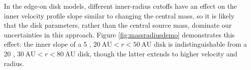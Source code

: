 \documentclass[twocolumn]{aastex61}
\newcommand{\sourcei}{SrcI\xspace}
\begin{document}




In the edge-on disk models, different inner-radius cutoffs have an effect on
the inner velocity profile slope similar to changing the central mass, so it is
likely that the disk parameters, rather than the central source mass, dominate
our uncertainties in this approach.  
Figure \ref{fig:massradiusdemo} demonstrates this effect: the inner slope of
a 5 \msun, $20~\mathrm{AU} < r < 50~\mathrm{AU}$ disk is indistinguishable
from a 20 \msun , $30~\mathrm{AU} < r < 80~\mathrm{AU}$ disk, though the latter
extends to higher velocity and radius.

\end{document}
